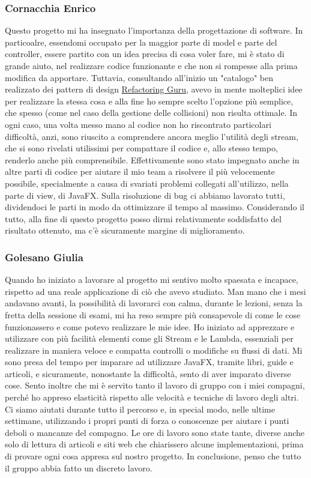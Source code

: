 \documentclass[a4paper,12pt]{report}
\begin{document}
\subsubsection{Cornacchia Enrico}
Questo progetto mi ha insegnato l'importanza della progettazione di software. In particoalre, essendomi occupato per la maggior parte di model e parte del controller, essere partito con un idea precisa di cosa voler fare, mi è stato di grande aiuto, nel realizzare codice funzionante e che non si rompesse alla prima modifica da apportare. Tuttavia, consultando all'inizio un "catalogo" ben realizzato dei pattern di design \href{https://refactoring.guru/design-patterns}{Refactoring Guru}, avevo in mente molteplici idee per realizzare la stessa cosa e alla fine ho sempre scelto l'opzione più semplice, che spesso (come nel caso della gestione delle collisioni) non risulta ottimale. In ogni caso, una volta messo mano al codice non ho riscontrato particolari difficoltà, anzi, sono riuscito a comprendere ancora meglio l'utilità degli stream, che si sono rivelati utilissimi per compattare il codice e, allo stesso tempo, renderlo anche più comprensibile. Effettivamente sono stato impegnato anche in altre parti di codice per aiutare il mio team a risolvere il più velocemente possibile, specialmente a causa di svariati problemi collegati all'utilizzo, nella parte di view, di JavaFX. Sulla risoluzione di bug ci abbiamo lavorato tutti, dividendoci le parti in modo da ottimizzare il tempo al massimo. Considerando il tutto, alla fine di questo progetto posso dirmi relativamente soddisfatto del risultato ottenuto, ma c'è sicuramente margine di miglioramento.

\subsubsection{Golesano Giulia}
Quando ho iniziato a lavorare al progetto mi sentivo molto spaesata e incapace, rispetto ad una reale applicazione di ciò che avevo studiato.
Man mano che i mesi andavano avanti, la possibilità di lavorarci con calma, durante le lezioni, senza la fretta della sessione di esami, mi ha reso sempre più consapevole di come le cose funzionassero e come potevo realizzare le mie idee.
Ho iniziato ad apprezzare e utilizzare con più facilità elementi come gli Stream e le Lambda, essenziali per realizzare in maniera veloce e compatta controlli o modifiche su flussi di dati.
Mi sono presa del tempo per imparare ad utilizzare JavaFX, tramite libri, guide e articoli, e sicuramente, nonostante la difficoltà, sento di aver imparato diverse cose.
Sento inoltre che mi è servito tanto il lavoro di gruppo con i miei compagni, perché ho appreso elasticità rispetto alle velocità e tecniche di lavoro degli altri.
Ci siamo aiutati durante tutto il percorso e, in special modo, nelle ultime settimane, utilizzando i propri punti di forza o conoscenze per aiutare i punti deboli o mancanze del compagno.
Le ore di lavoro sono state tante, diverse anche solo di lettura di articoli e siti web che chiarissero alcune implementazioni, prima di provare ogni cosa appresa sul nostro progetto.
In conclusione, penso che tutto il gruppo abbia fatto un discreto lavoro.
\end{document}
